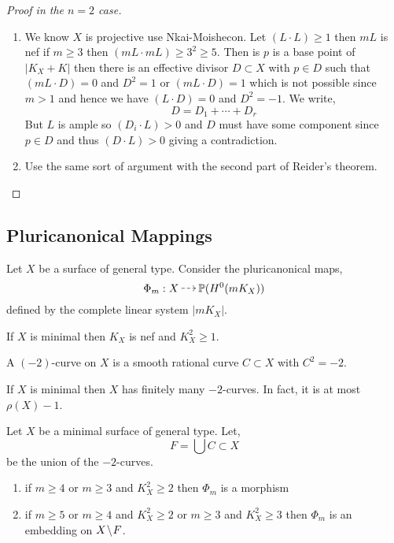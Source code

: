\documentclass[12pt]{article}
\begin{document}
\begin{proof}[Proof in the $n = 2$ case]
\begin{enumerate}
\item We know $X$ is projective use Nkai-Moishecon. Let $(L \cdot L) \ge 1$ then $m L$ is nef if $m \ge 3$ then $(m L \cdot m L) \ge 3^2 \ge 5$. Then is $p$ is a base point of $|K_X + K|$ then there is an effective divisor $D \subset X$ with $p \in D$ such that $(m L \cdot D) = 0$ and $D^2 = 1$ or $(m L \cdot D) = 1$ which is not possible since $m > 1$ and hence we have $(L \cdot D) = 0$ and $D^2 = -1$. We write,
\[ D = D_1 + \cdots + D_r \]
But $L$ is ample so $(D_i \cdot L) > 0$ and $D$ must have some component since $p \in D$ and thus $(D \cdot L) > 0$ giving a contradiction. 

\item Use the same sort of argument with the second part of Reider's theorem. 
\end{enumerate}
\end{proof}

\subsection{Pluricanonical Mappings}

Let $X$ be a surface of general type. Consider the pluricanonical maps,
\[ \Phi_m : X \rat \P(H^0(m K_X)) \]
defined by the complete linear system $|m K_X|$.

\begin{prop}
If $X$ is minimal then $K_X$ is nef and $K_X^2 \ge 1$.
\end{prop}

\begin{defn}
A $(-2)$-curve on $X$ is a smooth rational curve $C \subset X$ with $C^2 = -2$.
\end{defn}

\begin{prop}
If $X$ is minimal then $X$ has finitely many $-2$-curves. In fact, it is at most $\rho(X) - 1$. 
\end{prop}

\begin{theorem}[Bombieri]
Let $X$ be a minimal surface of general type. Let,
\[ F = \bigcup C \subset X \]
be the union of the $-2$-curves.

\begin{enumerate}
\item if $m \ge 4$ or $m \ge 3$ and $K_X^2 \ge 2$ then $\Phi_m$ is a morphism

\item if $m \ge 5$ or $m \ge 4$ and $K_X^2 \ge 2$ or $m \ge 3$ and $K_X^2 \ge 3$ then $\Phi_m$ is an embedding on $X \! \setminus \! F$. 
\end{enumerate}
\end{theorem}
\end{document}
